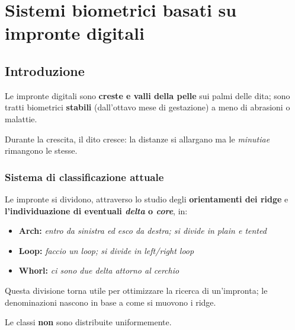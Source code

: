\chapter{Sistemi biometrici basati su impronte digitali}

\section{Introduzione}

Le impronte digitali sono \textbf{creste e valli della pelle} sui palmi delle dita;
sono tratti biometrici \textbf{stabili} (dall'ottavo mese di gestazione) a meno di abrasioni
o malattie.

Durante la crescita, il dito cresce: la distanze si allargano ma le 
\textit{minutiae} rimangono le stesse.

\subsection{Sistema di classificazione attuale}

Le impronte si dividono, attraverso lo studio degli \textbf{orientamenti dei ridge} e \textbf{l'individuazione
di eventuali \textit{delta} o \textit{core}}, in:
\begin{itemize}
    \item \textbf{Arch:} \textit{entro da sinistra ed esco da destra; si divide in plain e tented}
    \item \textbf{Loop:} \textit{faccio un loop; si divide in left/right loop}
    \item \textbf{Whorl:} \textit{ci sono due delta attorno al cerchio}
\end{itemize}
Questa divisione torna utile per ottimizzare la ricerca di un'impronta; le denominazioni
nascono in base a come si muovono i ridge.

Le classi \textbf{non} sono distribuite uniformemente.

